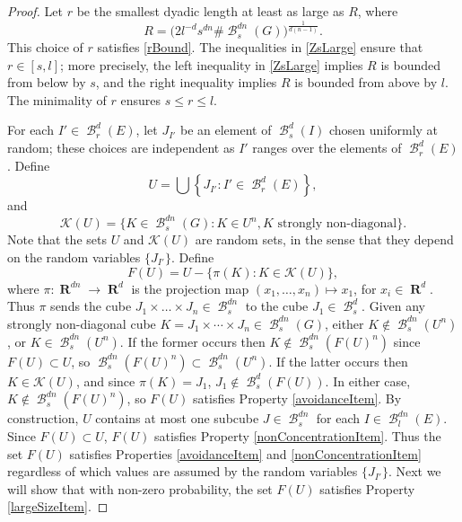 \documentclass[dvipsnames,letterpaper,12pt]{article}
\numberwithin{equation}{section}
\theoremstyle{plain}
\theoremstyle{remark}
\DeclareMathOperator{\RR}{\mathbf{R}}
\DeclareMathOperator{\B}{\mathcal{B}}
\begin{document}
\begin{proof}
	Let $r$ be the smallest dyadic length at least as large as $R$, where
	\begin{equation} \label{What-is-r}
		R = \big(2 l^{-d}s^{dn}\# \B^{dn}_s(G)\big)^{\frac{1}{d(n-1)}}.
	\end{equation} 
	This choice of $r$ satisfies \eqref{rBound}. 
	The inequalities in \eqref{ZsLarge} ensure that $r \in [s,l]$; more precisely, the left inequality in \eqref{ZsLarge} implies $R$ is bounded from below by $s$, and the right inequality implies $R$ is bounded from above by $l$. The minimality of $r$ ensures $s \leq r \leq l$.

	For each $I' \in \B_r^d(E)$, let $J_{I'}$ be an element of $\B^d_s(I)$ chosen uniformly at random; these choices are independent as $I'$ ranges over the elements of $\B_r^d(E)$. Define
	\[ 	U = \bigcup \left\{ J_{I'} : I' \in \B_r^d(E) \right\}, \]
	and
	\[ \mathcal{K}(U) = \{ K \in \B^{dn}_s(G) : K \in U^n, \text{$K$ strongly non-diagonal} \}. \]
	Note that the sets $U$ and $\mathcal{K}(U)$ are random sets, in the sense that they depend on the random variables $\{ J_{I'} \}$. Define
	\begin{equation} \label{defnOfF}
		F(U) = U - \{ \pi(K) : K \in \mathcal{K}(U) \},
	\end{equation}
	where $\pi: \RR^{dn} \to \RR^d$ is the projection map $(x_1, \dots, x_n) \mapsto x_1$, for $x_i \in \RR^d$. Thus $\pi$ sends the cube $J_1 \times \dots \times J_n\in \B^{dn}_s$ to the cube $J_1 \in \B^d_s$. Given any strongly non-diagonal cube $K = J_1 \times \cdots \times J_n \in \B_s^{dn}(G)$, either $K \not \in \B_s^{dn}(U^n)$, or $K \in \B_s^{dn}(U^n)$. If the former occurs then $K \not \in \B_s^{dn}(F(U)^n)$ since $F(U) \subset U$, so $\B_s^{dn}(F(U)^n) \subset \B_s^{dn}(U^n)$. If the latter occurs then $K \in \mathcal{K}(U)$, and since $\pi(K) = J_1$, $J_1 \not \in \B_s^d(F(U))$. In either case, $K \not \in \B_s^{dn}(F(U)^n)$, so $F(U)$ satisfies Property \ref{avoidanceItem}. By construction, $U$ contains at most one subcube $J \in \B^{dn}_s$ for each $I \in \B^{dn}_l(E)$. Since $F(U) \subset U$, $F(U)$ satisfies Property \ref{nonConcentrationItem}. Thus the set $F(U)$ satisfies Properties \ref{avoidanceItem} and \ref{nonConcentrationItem} regardless of which values are assumed by the random variables $\{ J_{I'} \}$. Next we will show that with non-zero probability, the set $F(U)$ satisfies Property \ref{largeSizeItem}. 


\end{proof}
\end{document}
